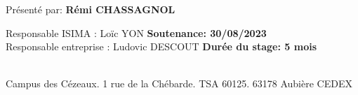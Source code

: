 \begin{titlepage}
\begin{center}
    \large
    Présenté par: \textbf{Rémi CHASSAGNOL}

    \vfill

    \vspace{0.5cm}
  \end{center}


  \large
  \noindent
  Responsable ISIMA : Loïc YON \hfill \textbf{Soutenance: 30/08/2023}\\
  Responsable entreprise : Ludovic DESCOUT \hfill \textbf{Durée du stage: 5 mois}\\~\\
  \raggedright
  \begin{center}
  Campus des Cézeaux. 1 rue de la Chébarde. TSA 60125. 63178 Aubière CEDEX\\
  \end{center}
\end{titlepage}
